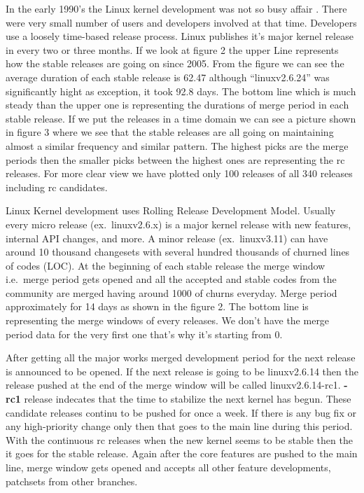 \documentclass{acm_proc_article-sp}
\begin{document}
In the early 1990's the Linux kernel development was not so busy affair \cite{linux_kernel}. There were very small number of users and developers involved at that time. Developers use a loosely time-based release process. Linux publishes it's major kernel release in every two or three months. If we look at figure 2 the upper Line represents how the stable releases are going on since 2005. From the figure we can see the average duration of each stable release is 62.47 although ``linuxv2.6.24'' was significantly hight as exception, it took 92.8 days. The bottom line which is much steady than the upper one is representing the durations of merge period in each stable release. If we put the releases in a time domain we can see a picture shown in figure 3 where we see that the stable releases are all going on maintaining almost a similar frequency and similar pattern. The highest picks are the merge periods then the smaller picks between the highest ones are representing the rc releases. For more clear view we have plotted only 100 releases of all 340 releases including rc candidates.

Linux Kernel development uses Rolling Release Development Model. Usually every micro release (ex.\ linuxv2.6.x) is a major kernel release with new features, internal API changes, and more. A minor release (ex.\ linuxv3.11) can have around  10 thousand changesets with several hundred thousands of churned lines of  codes (LOC). At the beginning of each stable release the merge window i.e.\ merge period gets opened and all the accepted and stable codes from the community are merged having around 1000 of churns everyday. Merge period approximately for 14 days as shown in the figure 2. The bottom line is representing the merge windows of every releases. We don't have the merge period data for the very first one that's why it's starting from 0.

After getting all the major works merged development period for the next release is announced to be opened. If the next release is going to be linuxv2.6.14 then the release pushed at the end of the merge window will be called linuxv2.6.14-rc1. \textbf{-rc1} release indecates that the time to stabilize the next kernel has begun. These candidate releases continu to be pushed for once a week. If there is any bug fix or any high-priority change only then that goes to the main line during this period. With the continuous rc releases when the new kernel seems to be stable then the it goes for the stable release. Again after the core features are pushed to the main line, merge window gets opened and accepts all other feature developments, patchsets from other branches.
\end{document}

